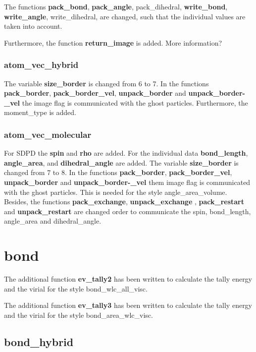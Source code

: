 \documentclass[a4paper,10pt]{scrreprt}
\begin{document}
The functions \textbf{pack\_bond}, \textbf{pack\_angle}, {pack\_dihedral}, \textbf{write\_bond}, \textbf{write\_angle}, {write\_dihedral},  are changed, such that the individual values are taken into account.

Furthermore, the function \textbf{return\_image} is added. More information?


\subsubsection{atom\_vec\_hybrid}
The variable \textbf{size\_border} is changed from 6 to 7.
In the functions \textbf{pack\_border}, \textbf{pack\_border\_vel}, \textbf{unpack\_border} and \textbf{unpack\_bor\-der-\_vel} the image flag is communicated with the ghost particles.
Furthermore, the moment\_type is added.

\subsubsection{atom\_vec\_molecular}

For SDPD the \textbf{spin} and \textbf{rho} are added.
For the individual data \textbf{bond\_length}, \textbf{angle\_area}, and \textbf{dihedral\_angle} are added.
The variable \textbf{size\_border} is changed from 7 to 8.
In the functions \textbf{pack\_border}, \textbf{pack\_border\_vel}, \textbf{unpack\_border} and \textbf{unpack\_bor\-der-\_vel} them image flag is communicated with the ghost particles.
This is needed for the style angle\_area\_volume.
Besides, the functions \textbf{pack\_exchange}, \textbf{unpack\_exchange} , \textbf{pack\_restart} and \textbf{unpack\_restart} are changed order to communicate the spin, bond\_length, angle\_area and dihedral\_angle.


\section{bond}

The additional function \textbf{ev\_tally2} has been written to calculate the tally energy and the virial for the style bond\_wlc\_all\_visc.

The additional function \textbf{ev\_tally3} has been written to calculate the tally energy and the virial for the style bond\_area\_wlc\_visc.

\subsection{bond\_hybrid}
\end{document}
